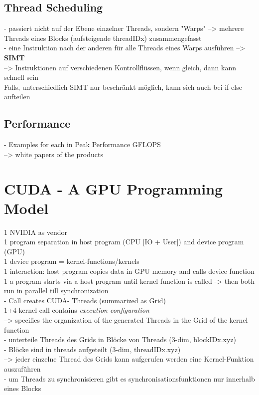\documentclass[a4paper,12pt]{llncs}
\numberwithin{equation}{section}
\begin{document}
\subsection{Thread Scheduling}
        - passiert nicht auf der Ebene einzelner Threads, sondern "Warps" --> mehrere Threads eines Blocks (aufsteigende threadIDx) zusammengefasst\\
        - eine Instruktion nach der anderen für alle Threads eines Warps ausführen --> \textbf{SIMT}\\
        --> Instruktionen auf verschiedenen Kontrollflüssen, wenn gleich, dann kann schnell sein\\
         	Falls, unterschiedlich SIMT nur beschränkt möglich, kann sich auch bei if-else aufteilen\\
         
\subsection{Performance}
  - Examples for each in Peak Performance GFLOPS\\
    --> white papers of the products


\section{CUDA - A GPU Programming Model}
      1 NVIDIA as vendor\\
      1 program separation in host program (CPU [IO + User]) and device program (GPU)\\
      1 device program = kernel-functions/kernels\\
	  1 interaction: host program copies data in GPU memory and calls device function\\
	  1 a program starts via a host program until kernel function is called -> then both run in parallel till synchronization\\
		- Call creates CUDA- Threads (summarized as Grid)\\
	  1+4 kernel call contains \textit{execution configuration}\\
	    --> specifies the organization of the generated Threads in the Grid of the kernel function\\
	  	  - unterteile Threads des Grids in Blöcke von Threads (3-dim, blockIDx.xyz)\\
	  	  - Blöcke sind in threads aufgeteilt (3-dim, threadIDx.xyz)\\
	   --> jeder einzelne Thread des Grids kann aufgerufen werden eine Kernel-Funktion auszuführen\\
          - um Threads zu synchronisieren gibt es synchronisationsfunktionen nur innerhalb eines Blocks\\
          
\end{document}
